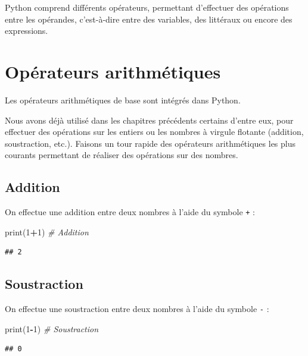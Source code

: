 \documentclass[
  12pt,
]{book}
\newenvironment{Shaded}{\begin{snugshade}}{\end{snugshade}}
\newcommand{\BuiltInTok}[1]{#1}
\newcommand{\CommentTok}[1]{\textcolor[rgb]{0.56,0.35,0.01}{\textit{#1}}}
\newcommand{\DecValTok}[1]{\textcolor[rgb]{0.00,0.00,0.81}{#1}}
\newcommand{\NormalTok}[1]{#1}
\newcommand{\OperatorTok}[1]{\textcolor[rgb]{0.81,0.36,0.00}{\textbf{#1}}}
\numberwithin{equation}{section}
\numberwithin{countremarque}{section}
\begin{document}
Python comprend différents opérateurs, permettant d'effectuer des opérations entre les opérandes, c'est-à-dire entre des variables, des littéraux ou encore des expressions.

\section{Opérateurs arithmétiques}\label{operateurs-arithmetiques}

Les opérateurs arithmétiques de base sont intégrés dans Python.

Nous avons déjà utilisé dans les chapitres précédents certains d'entre eux, pour effectuer des opérations sur les entiers ou les nombres à virgule flotante (addition, soustraction, etc.). Faisons un tour rapide des opérateurs arithmétiques les plus courants permettant de réaliser des opérations sur des nombres.

\subsection{Addition}\label{addition}

On effectue une addition entre deux nombres à l'aide du symbole \texttt{+} :

\begin{Shaded}
\begin{Highlighting}[]
\BuiltInTok{print}\NormalTok{(}\DecValTok{1}\OperatorTok{+}\DecValTok{1}\NormalTok{) }\CommentTok{\# Addition}
\end{Highlighting}
\end{Shaded}

\begin{lstlisting}
## 2
\end{lstlisting}

\subsection{Soustraction}\label{soustraction}

On effectue une soustraction entre deux nombres à l'aide du symbole \texttt{-} :

\begin{Shaded}
\begin{Highlighting}[]
\BuiltInTok{print}\NormalTok{(}\DecValTok{1}\OperatorTok{{-}}\DecValTok{1}\NormalTok{) }\CommentTok{\# Soustraction}
\end{Highlighting}
\end{Shaded}

\begin{lstlisting}
## 0
\end{lstlisting}
\end{document}
